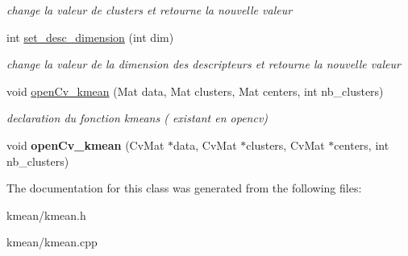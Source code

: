 \begin{DoxyCompactItemize}
\begin{DoxyCompactList}\small\item\em change la valeur de clusters et retourne la nouvelle valeur \end{DoxyCompactList}\item 
\hypertarget{classkmean_a10ef747e31910444349659d60dd01a80}{
int \hyperlink{classkmean_a10ef747e31910444349659d60dd01a80}{set\_\-desc\_\-dimension} (int dim)}
\label{classkmean_a10ef747e31910444349659d60dd01a80}

\begin{DoxyCompactList}\small\item\em change la valeur de la dimension des descripteurs et retourne la nouvelle valeur \end{DoxyCompactList}\item 
\hypertarget{classkmean_a39af0fa051cf82f809fdd76c09a877a0}{
void \hyperlink{classkmean_a39af0fa051cf82f809fdd76c09a877a0}{openCv\_\-kmean} (Mat data, Mat clusters, Mat centers, int nb\_\-clusters)}
\label{classkmean_a39af0fa051cf82f809fdd76c09a877a0}

\begin{DoxyCompactList}\small\item\em declaration du fonction kmeans ( existant en opencv) \end{DoxyCompactList}\item 
\hypertarget{classkmean_aa056b14aebc3588b9e3bd4fc5b34352a}{
void {\bfseries openCv\_\-kmean} (CvMat $\ast$data, CvMat $\ast$clusters, CvMat $\ast$centers, int nb\_\-clusters)}
\label{classkmean_aa056b14aebc3588b9e3bd4fc5b34352a}

\end{DoxyCompactItemize}


The documentation for this class was generated from the following files:\begin{DoxyCompactItemize}
\item 
kmean/kmean.h\item 
kmean/kmean.cpp\end{DoxyCompactItemize}
